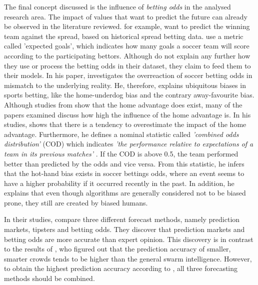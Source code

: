 The final concept discussed is the influence of \emph{betting odds} in the analysed research area. The impact of values that want to predict the future can already be observed in the literature reviewed. \citet{landers_machine_2017} for example, want to predict the winning team against the spread, based on historical spread betting data. \citet{shah_poisson_2021} use a metric called 'expected goals', which indicates how many goals a soccer team will score according to the participating bettors. Although \citet{deng_analysis_2020} do not explain any further how they use or process the betting odds in their dataset, they claim to feed them to their models. In his paper, \citet{wheatcroft_profiting_2020} investigates the overreaction of soccer betting odds in mismatch to the underlying reality. He, therefore, explains ubiquitous biases in sports betting, like the home-underdog bias and the contrary away-favourite bias. Although studies from \citet{nevill_home_1999} show that the home advantage does exist, many of the papers examined discuss how high the influence of the home advantage is. \parencite{bonomo_mathematical_2014, landers_machine_2017,shah_poisson_2021,deng_analysis_2020} In his studies, \citet{wheatcroft_profiting_2020} shows that there is a tendency to overestimate the impact of the home advantage. Furthermore, he defines a nominal statistic called \emph{'combined odds distribution'} (COD) which indicates \emph{'the performance relative to expectations of a team in its previous matches'} \parencite[, p. 4]{wheatcroft_profiting_2020}. If the COD is above 0.5, the team performed better than predicted by the odds and vice versa. From this statistic, he infers that the hot-hand bias exists in soccer bettings odds, where an event seems to have a higher probability if it occurred recently in the past. In addition, he explains that even though algorithms are generally considered not to be biased prone, they still are created by biased humans.

In their studies, \citet{spann_sports_2009} compare three different forecast methods, namely prediction markets, tipsters and betting odds. They discover that prediction markets and betting odds are more accurate than expert opinion. This discovery is in contrast to the results of \citet{goldstein_wisdom_2014}, who figured out that the prediction accuracy of smaller, smarter crowds tends to be higher than the general swarm intelligence. However, to obtain the highest prediction accuracy according to \citet{spann_sports_2009}, all three forecasting methods should be combined.

